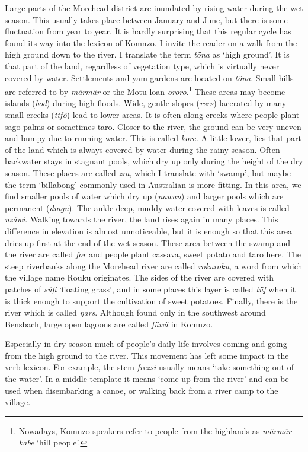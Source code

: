 Large parts of the Morehead district are inundated by rising water during the wet season. This usually takes place between January and June, but there is some fluctuation from year to year. It is hardly surprising that this regular cycle has found its way into the lexicon of Komnzo. I invite the reader on a walk from the high ground down to the river. I translate the term \emph{töna} as `high ground'. It is that part of the land, regardless of vegetation type, which is virtually never covered by water. Settlements and yam gardens are located on \emph{töna}. Small hills are referred to by \emph{märmär} or the Motu loan \emph{ororo}.\footnote{Nowadays, Komnzo speakers refer to people from the highlands as \emph{märmär kabe} `hill people'.} These areas may become islands (\emph{bod}) during high floods. Wide, gentle slopes (\emph{rsrs}) lacerated by many small creeks (\emph{ttfö}) lead to lower areas. It is often along creeks where people plant sago palms or sometimes taro. Closer to the river, the ground can be very uneven and bumpy due to running water. This is called \emph{kore}. A little lower, lies that part of the land which is always covered by water during the rainy season. Often backwater stays in stagnant pools, which dry up only during the height of the dry season. These places are called \emph{zra}, which I translate with `swamp', but maybe the term `billabong' commonly used in Australian  is more fitting. In this area, we find smaller pools of water which dry up  (\emph{nawan}) and larger pools which are permanent (\emph{dmgu}). The ankle-deep, muddy water covered with leaves is called \emph{nzäwi}. Walking towards the river, the land rises again in many places. This difference in elevation is almost unnoticeable, but it is enough so that this area dries up first at the end of the wet season. These area between the swamp and the river are called \emph{for} and people plant cassava, sweet potato and taro here. The steep riverbanks along the Morehead river are called \emph{rokuroku}, a word from which the village name Rouku originates. The sides of the river are covered with patches of \emph{süfi} `floating grass', and in some places this layer is called \emph{tüf} when it is thick enough to support the cultivation of sweet potatoes. Finally, there is the river which is called \emph{ŋars}. Although found only in the southwest around Bensbach, large open lagoons are called \emph{füwä} in Komnzo.%

Especially in dry season much of people's daily life involves coming and going from the high ground to the river. This movement has left some impact in the verb lexicon. For example, the stem \emph{frezsi} usually means `take something out of the water'. In a middle template it means `come up from the river' and can be used when disembarking a canoe, or walking back from a river camp to the village.%

